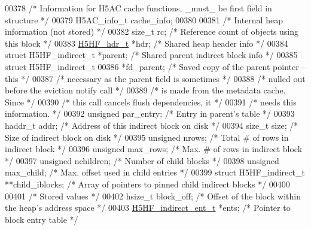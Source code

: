 \begin{DoxyCode}
00378     \textcolor{comment}{/* Information for H5AC cache functions, \_must\_ be first field in structure */}
00379     H5AC\_info\_t cache\_info;
00380 
00381     \textcolor{comment}{/* Internal heap information (not stored) */}
00382     \textcolor{keywordtype}{size\_t}      rc;             \textcolor{comment}{/* Reference count of objects using this block */}
00383     \hyperlink{struct_h5_h_f__hdr__t}{H5HF\_hdr\_t}    *hdr;           \textcolor{comment}{/* Shared heap header info                */}
00384     \textcolor{keyword}{struct }H5HF\_indirect\_t *parent; \textcolor{comment}{/* Shared parent indirect block info  */}
00385     \textcolor{keyword}{struct }H5HF\_indirect\_t 
00386         *fd\_parent; \textcolor{comment}{/* Saved copy of the parent pointer -- this   */}
00387                 \textcolor{comment}{/* necessary as the parent field is sometimes */}
00388                 \textcolor{comment}{/* nulled out before the eviction notify call */}
00389                 \textcolor{comment}{/* is made from the metadata cache.  Since    */}
00390                 \textcolor{comment}{/* this call cancels flush dependencies, it   */}
00391                 \textcolor{comment}{/* needs this information.            */}
00392     \textcolor{keywordtype}{unsigned}    par\_entry;      \textcolor{comment}{/* Entry in parent's table                    */}
00393     haddr\_t     addr;           \textcolor{comment}{/* Address of this indirect block on disk     */}
00394     \textcolor{keywordtype}{size\_t}      size;           \textcolor{comment}{/* Size of indirect block on disk             */}
00395     \textcolor{keywordtype}{unsigned}    nrows;          \textcolor{comment}{/* Total # of rows in indirect block          */}
00396     \textcolor{keywordtype}{unsigned}    max\_rows;       \textcolor{comment}{/* Max. # of rows in indirect block           */}
00397     \textcolor{keywordtype}{unsigned}    nchildren;      \textcolor{comment}{/* Number of child blocks                     */}
00398     \textcolor{keywordtype}{unsigned}    max\_child;      \textcolor{comment}{/* Max. offset used in child entries          */}
00399     \textcolor{keyword}{struct }H5HF\_indirect\_t **child\_iblocks; \textcolor{comment}{/* Array of pointers to pinned child indirect blocks */}
00400 
00401     \textcolor{comment}{/* Stored values */}
00402     hsize\_t     block\_off;      \textcolor{comment}{/* Offset of the block within the heap's address space */}
00403     \hyperlink{struct_h5_h_f__indirect__ent__t}{H5HF\_indirect\_ent\_t} *ents;  \textcolor{comment}{/* Pointer to block entry table               */}

\end{DoxyCode}
